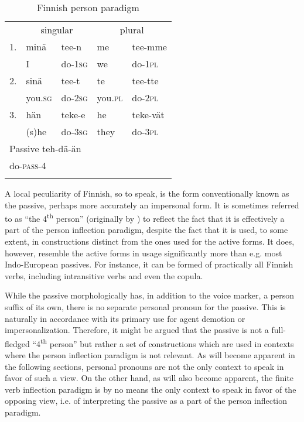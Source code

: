 \documentclass[output=paper, colorlinks,citecolor=brown]{langsci/langscibook}
\begin{document}
\begin{table}
    \caption{Finnish person paradigm\label{tab:leino:1}}
    \begin{tabular}{ *{5}{l} }
        \lsptoprule
            & \multicolumn{2}{c}{singular} & \multicolumn{2}{c}{plural}\\\cmidrule(lr){2-3}\cmidrule(lr){4-5}
            {1.} &  minä & tee-n  &  me &  tee-mme\\
                 & I & do-\textsc{1sg}  &  we & do-\textsc{1pl}\\
            {2.} &  sinä & tee-t &  te & tee-tte\\     
                 & you.\textsc{sg} & do-\textsc{2sg}  & you.\textsc{pl} & do-\textsc{2pl}\\
            {3.} & hän & teke-e  &  he & teke-vät\\
                 & (s)he & do-\textsc{3sg} & they & do-\textsc{3pl}\\\midrule
            \multicolumn{5}{l}{Passive \hfill teh-dä-än \hfill}  \\
            \multicolumn{5}{l}{\hphantom{Passive} \hfill  do-\textsc{pass}{}-4 \hfill}\\
        \lspbottomrule
    \end{tabular}
\end{table}

A local peculiarity of Finnish, so to speak, is the form conventionally known as the passive, perhaps more accurately an impersonal form. It is sometimes referred to as “the 4\textsuperscript{th} person” (originally by \citealt{Tuomikoski1971}) to reflect the fact that it is effectively a part of the person inflection paradigm, despite the fact that it is used, to some extent, in constructions distinct from the ones used for the active forms. It does, however, resemble the active forms in usage significantly more than e.g. most Indo-European passives. For instance, it can be formed of practically all Finnish verbs, including intransitive verbs and even the copula.

While the passive morphologically has, in addition to the voice marker, a person suffix of its own, there is no separate personal pronoun for the passive. This is naturally in accordance with its primary use for agent demotion or impersonalization. Therefore, it might be argued that the passive is not a full-fledged “4\textsuperscript{th} person” but rather a set of constructions which are used in contexts where the person inflection paradigm is not relevant. As will become apparent in the following sections, personal pronouns are not the only context to speak in favor of such a view. On the other hand, as will also become apparent, the finite verb inflection paradigm is by no means the only context to speak in favor of the opposing view, i.e. of interpreting the passive as a part of the person inflection paradigm.
\end{document}
